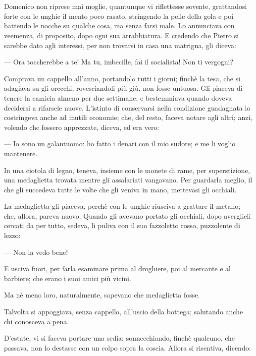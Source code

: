 \chapter{}

Domenico non riprese mai moglie, quantunque vi riflettesse sovente, grattandosi forte con le unghie il mento poco rasato, stringendo la pelle della gola e poi battendo le nocche su qualche cosa, ma senza farsi male. Lo annunciava con veemenza, di proposito, dopo ogni sua arrabbiatura. E credendo che Pietro si sarebbe dato agli interessi, per non trovarsi in casa una matrigna, gli diceva:

— Ora toccherebbe a te! Ma tu, imbecille, fai il socialista! Non ti vergogni?

Comprava un cappello all’anno, portandolo tutti i giorni; finchè la tesa, che si adagiava su gli orecchi, rovesciandoli più giù, non fosse untuosa. Gli piaceva di tenere la camicia almeno per due settimane; e bestemmiava quando doveva decidersi a rifarsele nuove. L’istinto di conservarsi nella condizione guadagnata lo costringeva anche ad inutili economie; che, del resto, faceva notare agli altri; anzi, volendo che fossero apprezzate, diceva, ed era vero:

— Io sono un galantuomo: ho fatto i denari con il mio sudore; e me li voglio mantenere.

In una ciotola di legno, teneva, insieme con le monete di rame, per superstizione, una medaglietta trovata mentre gli assalariati vangavano. Per guardarla meglio, il che gli succedeva tutte le volte che gli veniva in mano, mettevasi gli occhiali.

La medaglietta gli piaceva, perchè con le unghie riusciva a grattare il metallo; che, allora, pareva nuovo. Quando gli avevano portato gli occhiali, dopo averglieli cercati da per tutto, sedeva, li puliva con il suo fazzoletto rosso, puzzolente di lezzo:

— Non la vedo bene!

E usciva fuori, per farla esaminare prima al droghiere, poi al mercante e al barbiere; che erano i suoi amici più vicini.

Ma nè meno loro, naturalmente, sapevano che medaglietta fosse.

Talvolta si appoggiava, senza cappello, all’uscio della bottega; salutando anche chi conosceva a pena.

D’estate, vi si faceva portare una sedia; sonnecchiando, finchè qualcuno, che passava, non lo destasse con un colpo sopra la coscia. Allora si risentiva, dicendo:

